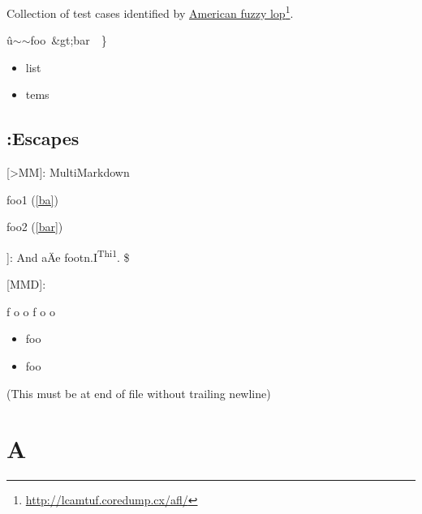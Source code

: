 
\def\mytitle{Fuzz Testing}



Collection of test cases identified by \href{http://lcamtuf.coredump.cx/afl/}{American fuzzy lop}\footnote{\href{http://lcamtuf.coredump.cx/afl/}{http:\slash \slash lcamtuf.coredump.cx\slash afl\slash }}.

û\ensuremath{\sim}\ensuremath{\sim}foo~&gt;bar~~\}

\begin{itemize}
\item list

\item tems

\end{itemize}

\chapter{:Escapes}
\label{escaped}

[>MM]: MultiMarkdown

foo1 (\autoref{ba})

foo2 (\autoref{bar})

]: And aÄe footn.I\textsuperscript{Thi1}. \$

{[MMD]}:

f \gls{o o} f \gls{o o}

\begin{itemize}
\item foo

\item foo

\end{itemize}

(This must be at end of file without trailing newline)

\part{A}
\label{a}



